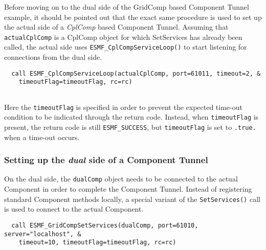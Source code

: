    \begin{sloppypar}
   Before moving on to the dual side of the GridComp based Component Tunnel 
   example, it should be pointed out that the exact same procedure is used to
   set up the actual side of a {\em CplComp} based Component Tunnel. Assuming
   that {\tt actualCplComp} is a CplComp object for which SetServices has already
   been called, the actual side uses {\tt ESMF\_CplCompServiceLoop()} to start
   listening for connections from the dual side.
   \end{sloppypar} 

 \begin{verbatim}
  call ESMF_CplCompServiceLoop(actualCplComp, port=61011, timeout=2, &
    timeoutFlag=timeoutFlag, rc=rc)
 
\end{verbatim}
 

   Here the {\tt timeoutFlag} is specified in order to prevent the expected
   time-out condition to be indicated through the return code. Instead, when
   {\tt timeoutFlag} is present, the return code is still {\tt ESMF\_SUCCESS}, 
   but {\tt timeoutFlag} is set to {\tt .true.} when a time-out occurs. 

  \subsubsection{Setting up the {\em dual} side of a Component Tunnel}
   
   \label{sec:CompTunnelDualSide}
  
   On the dual side, the {\tt dualComp} object needs to be connected to the
   actual Component in order to complete the Component Tunnel. Instead of
   registering standard Component methods locally, a special variant of the
   {\tt SetServices()} call is used to connect to the actual Component. 

 \begin{verbatim}
  call ESMF_GridCompSetServices(dualComp, port=61010, server="localhost", &
    timeout=10, timeoutFlag=timeoutFlag, rc=rc)
 
\end{verbatim}
 

